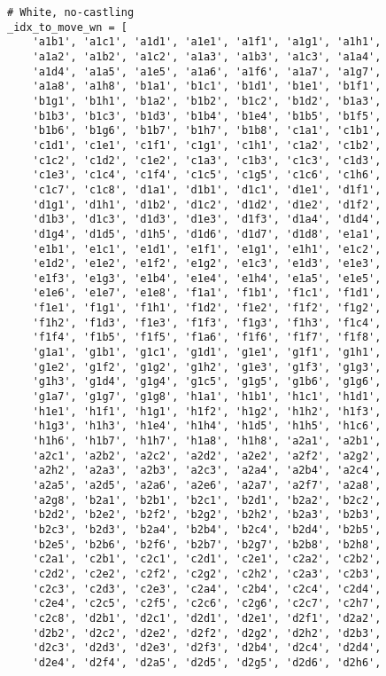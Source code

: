 \begin{verbatim}
# White, no-castling
_idx_to_move_wn = [
    'a1b1', 'a1c1', 'a1d1', 'a1e1', 'a1f1', 'a1g1', 'a1h1',
    'a1a2', 'a1b2', 'a1c2', 'a1a3', 'a1b3', 'a1c3', 'a1a4',
    'a1d4', 'a1a5', 'a1e5', 'a1a6', 'a1f6', 'a1a7', 'a1g7',
    'a1a8', 'a1h8', 'b1a1', 'b1c1', 'b1d1', 'b1e1', 'b1f1',
    'b1g1', 'b1h1', 'b1a2', 'b1b2', 'b1c2', 'b1d2', 'b1a3',
    'b1b3', 'b1c3', 'b1d3', 'b1b4', 'b1e4', 'b1b5', 'b1f5',
    'b1b6', 'b1g6', 'b1b7', 'b1h7', 'b1b8', 'c1a1', 'c1b1',
    'c1d1', 'c1e1', 'c1f1', 'c1g1', 'c1h1', 'c1a2', 'c1b2',
    'c1c2', 'c1d2', 'c1e2', 'c1a3', 'c1b3', 'c1c3', 'c1d3',
    'c1e3', 'c1c4', 'c1f4', 'c1c5', 'c1g5', 'c1c6', 'c1h6',
    'c1c7', 'c1c8', 'd1a1', 'd1b1', 'd1c1', 'd1e1', 'd1f1',
    'd1g1', 'd1h1', 'd1b2', 'd1c2', 'd1d2', 'd1e2', 'd1f2',
    'd1b3', 'd1c3', 'd1d3', 'd1e3', 'd1f3', 'd1a4', 'd1d4',
    'd1g4', 'd1d5', 'd1h5', 'd1d6', 'd1d7', 'd1d8', 'e1a1',
    'e1b1', 'e1c1', 'e1d1', 'e1f1', 'e1g1', 'e1h1', 'e1c2',
    'e1d2', 'e1e2', 'e1f2', 'e1g2', 'e1c3', 'e1d3', 'e1e3',
    'e1f3', 'e1g3', 'e1b4', 'e1e4', 'e1h4', 'e1a5', 'e1e5',
    'e1e6', 'e1e7', 'e1e8', 'f1a1', 'f1b1', 'f1c1', 'f1d1',
    'f1e1', 'f1g1', 'f1h1', 'f1d2', 'f1e2', 'f1f2', 'f1g2',
    'f1h2', 'f1d3', 'f1e3', 'f1f3', 'f1g3', 'f1h3', 'f1c4',
    'f1f4', 'f1b5', 'f1f5', 'f1a6', 'f1f6', 'f1f7', 'f1f8',
    'g1a1', 'g1b1', 'g1c1', 'g1d1', 'g1e1', 'g1f1', 'g1h1',
    'g1e2', 'g1f2', 'g1g2', 'g1h2', 'g1e3', 'g1f3', 'g1g3',
    'g1h3', 'g1d4', 'g1g4', 'g1c5', 'g1g5', 'g1b6', 'g1g6',
    'g1a7', 'g1g7', 'g1g8', 'h1a1', 'h1b1', 'h1c1', 'h1d1',
    'h1e1', 'h1f1', 'h1g1', 'h1f2', 'h1g2', 'h1h2', 'h1f3',
    'h1g3', 'h1h3', 'h1e4', 'h1h4', 'h1d5', 'h1h5', 'h1c6',
    'h1h6', 'h1b7', 'h1h7', 'h1a8', 'h1h8', 'a2a1', 'a2b1',
    'a2c1', 'a2b2', 'a2c2', 'a2d2', 'a2e2', 'a2f2', 'a2g2',
    'a2h2', 'a2a3', 'a2b3', 'a2c3', 'a2a4', 'a2b4', 'a2c4',
    'a2a5', 'a2d5', 'a2a6', 'a2e6', 'a2a7', 'a2f7', 'a2a8',
    'a2g8', 'b2a1', 'b2b1', 'b2c1', 'b2d1', 'b2a2', 'b2c2',
    'b2d2', 'b2e2', 'b2f2', 'b2g2', 'b2h2', 'b2a3', 'b2b3',
    'b2c3', 'b2d3', 'b2a4', 'b2b4', 'b2c4', 'b2d4', 'b2b5',
    'b2e5', 'b2b6', 'b2f6', 'b2b7', 'b2g7', 'b2b8', 'b2h8',
    'c2a1', 'c2b1', 'c2c1', 'c2d1', 'c2e1', 'c2a2', 'c2b2',
    'c2d2', 'c2e2', 'c2f2', 'c2g2', 'c2h2', 'c2a3', 'c2b3',
    'c2c3', 'c2d3', 'c2e3', 'c2a4', 'c2b4', 'c2c4', 'c2d4',
    'c2e4', 'c2c5', 'c2f5', 'c2c6', 'c2g6', 'c2c7', 'c2h7',
    'c2c8', 'd2b1', 'd2c1', 'd2d1', 'd2e1', 'd2f1', 'd2a2',
    'd2b2', 'd2c2', 'd2e2', 'd2f2', 'd2g2', 'd2h2', 'd2b3',
    'd2c3', 'd2d3', 'd2e3', 'd2f3', 'd2b4', 'd2c4', 'd2d4',
    'd2e4', 'd2f4', 'd2a5', 'd2d5', 'd2g5', 'd2d6', 'd2h6',

\end{verbatim}
